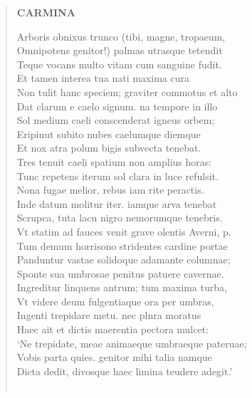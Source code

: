 \documentclass[11pt, a4paper]{report}
\begin{document}
\begin{verse}
    \begin{center} \textbf{CARMINA} \end{center} \marginpar{[58]} Arboris obnixus trunco (tibi, magne, tropaeum, \\ Omnipotens genitor!) palmas utrasque tetendit \\ Teque vocans multo vitam cum sanguine fudit. \\ Et tamen interea tua nati maxima cura \\ Non tulit hanc speciem; graviter commotus et alto \\ Dat clarum e caelo signum. na tempore in illo \\ Sol medium caeli conscenderat igneus orbem; \\ Eripiuut subito nubes caelumque diemque \\ Et nox atra polum bigis subvecta tenebat. \\ Tres tenuit caeli spatium non amplius horas: \\ Tunc repetens iterum sol clara in luce refulsit. \\ Nona fugae melior, rebus iam rite peractis. \\ Inde datum molitur iter. iamque arva tenebat \\ Scrupca, tuta lacu nigro nemorumque tenebris. \\ Vt statim ad fauces venit grave olentis Averni, p. \\ Tum demum horrisono stridentes cardine portae \\ Panduntur vastae solidoque adamante columnae; \\ Sponte sua umbrosae penitus patuere cavernae. \\ Ingreditur linquens antrum; tum maxima turba, \\ Vt videre deum fulgentiaque ora per umbras, \\ Ingenti trepidare metu. nec plnra moratus \\ Haec ait et dictis maerentia pectora mulcet: \\ ‘Ne trepidate, meae animaeque umbraeque pateruae; \\ Vobis parta quies. genitor mihi talia namque \\ Dicta dedit, divosque haec limina teudere adegit.’ \\ 
        ﻿\pagebreak 

\end{verse}
\end{document}
